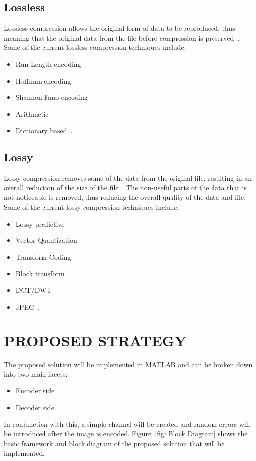 \documentclass[10pt,twocolumn, a4paper]{witseiepaper}
\begin{document}
\subsection{Lossless}
\label{sec: Lossless}
Lossless compression allows the original form of data to be reproduced, thus meaning that the original data from the file before compression is preserved~\cite{Loss}. Some of the current lossless compression techniques include:
\begin{itemize}
\item Run-Length encoding
\item Huffman encoding
\item Shannon-Fano encoding
\item Arithmetic
\item Dictionary based~\cite{DiffTech}.
\end{itemize}


\subsection{Lossy}
\label{sec: Lossy}
Lossy compression removes some of the data from the original file, resulting in an overall reduction of the size of the file~\cite{Loss}. The non-useful parts of the data that is not noticeable is removed, thus reducing the overall quality of the data and file. Some of the current lossy compression techniques include:
\begin{itemize}
\item Lossy predictive
\item Vector Quantization
\item Transform Coding
\item Block transform
\item DCT/DWT
\item JPEG~\cite{DiffTech}.
\end{itemize}

%
\section{PROPOSED STRATEGY}
\label{sec: Proposed Strategy}
The proposed solution will be implemented in MATLAB and can be broken down into two main facets:
\begin{itemize}
\item Encoder side
\item Decoder side.
\end{itemize}
In conjunction with this, a simple channel will be created and random errors will be introduced after the image is encoded. Figure~\ref{fig: Block Diagram} shows the basic framework and block diagram of the proposed solution that will be implemented.
\end{document}
